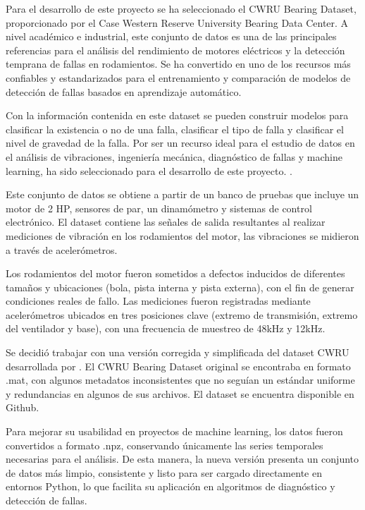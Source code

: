 \documentclass[11pt,a4paper,spanish]{book}
\numberwithin{equation}{chapter}
\numberwithin{figure}{chapter}
\begin{document}
Para el desarrollo de este proyecto se ha seleccionado el CWRU Bearing Dataset, proporcionado por el Case Western Reserve University Bearing Data Center. A nivel académico e industrial, este conjunto de datos es una de las principales referencias para el análisis del rendimiento de motores eléctricos y la detección temprana de fallas en rodamientos. Se ha convertido en uno de los recursos más confiables y estandarizados para el entrenamiento y comparación de modelos de detección de fallas basados en aprendizaje automático.


Con la información contenida en este dataset se pueden construir modelos para clasificar la existencia o no de una falla, clasificar el tipo de falla y clasificar el nivel de gravedad de la falla. Por ser un recurso ideal para el estudio de datos en el análisis de vibraciones, ingeniería mecánica, diagnóstico de fallas y machine learning, ha sido seleccionado para el desarrollo de este proyecto. \cite{caseWesternBearingData}. 


Este conjunto de datos se obtiene a partir de un banco de pruebas que incluye un motor de 2 HP, sensores de par, un dinamómetro y sistemas de control electrónico. El dataset contiene las señales de salida resultantes al realizar mediciones de vibración en los rodamientos del motor, las vibraciones se midieron a través de acelerómetros.  


Los rodamientos del motor fueron sometidos a defectos inducidos de diferentes tamaños y ubicaciones (bola, pista interna y pista externa), con el fin de generar condiciones reales de fallo. Las mediciones fueron registradas mediante acelerómetros ubicados en tres posiciones clave (extremo de transmisión, extremo del ventilador y base), con una frecuencia de muestreo de 48kHz y 12kHz. 


Se decidió trabajar con una versión corregida y simplificada del dataset CWRU desarrollada por \cite{rigas2024marine}. El CWRU Bearing Dataset original se encontraba en formato .mat, con algunos metadatos inconsistentes que no seguían un estándar uniforme y redundancias en algunos de sus archivos. El dataset se encuentra disponible en Github. 


Para mejorar su usabilidad en proyectos de machine learning, los datos fueron convertidos a formato .npz, conservando únicamente las series temporales necesarias para el análisis. De esta manera, la nueva versión presenta un conjunto de datos más limpio, consistente y listo para ser cargado directamente en entornos Python, lo que facilita su aplicación en algoritmos de diagnóstico y detección de fallas.
\end{document}
